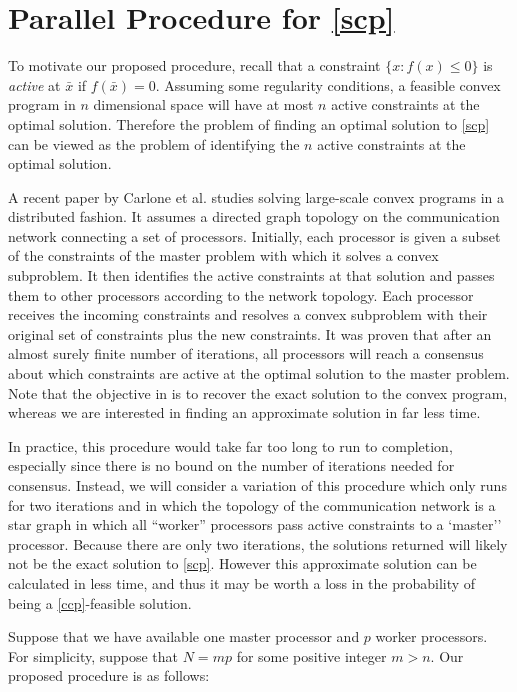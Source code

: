 \documentclass[12pt]{article}
\begin{document}
\section*{Parallel Procedure for \ref{scp}}
To motivate our proposed procedure, recall that a constraint $\{ x: f(x) \leq 0 \}$ is \emph{active} at $\bar{x}$ if $f(\bar{x}) = 0$. Assuming some regularity conditions, a feasible convex program in $n$ dimensional space will have at most $n$ active constraints at the optimal solution.
Therefore the problem of finding an optimal solution to \ref{scp} can be viewed as the problem of identifying the $n$ active constraints at the optimal solution.

A recent paper by Carlone et al. \cite{carlone2014} studies solving large-scale convex programs in a distributed fashion.
It assumes a directed graph topology on the communication network connecting a set of processors.
Initially, each processor is given a subset of the constraints of the master problem with which it solves a convex subproblem.
It then identifies the active constraints at that solution and passes them to other processors according to the network topology.
Each processor receives the incoming constraints and resolves a convex subproblem with their original set of constraints plus the new constraints.
It was proven that after an almost surely finite number of iterations, all processors will reach a consensus about which constraints are active at the optimal solution to the master problem.
Note that the objective in \cite{carlone2014} is to recover the exact solution to the convex program, whereas we are interested in finding an approximate solution in far less time.

In practice, this procedure would take far too long to run to completion, especially since there is no bound on the number of iterations needed for consensus.
Instead, we will consider a variation of this procedure which only runs for two iterations and in which the topology of the communication network is a star graph in which all ``worker'' processors pass active constraints to a `master'' processor.
Because there are only two iterations, the solutions returned will likely not be the exact solution to \ref{scp}.
However this approximate solution can be calculated in less time, and thus it may be worth a loss in the probability of being a \ref{ccp}-feasible solution.

Suppose that we have available one master processor and $p$ worker processors.
For simplicity, suppose that $N = mp$ for some positive integer $m > n$.
Our proposed procedure is as follows:
\end{document}
